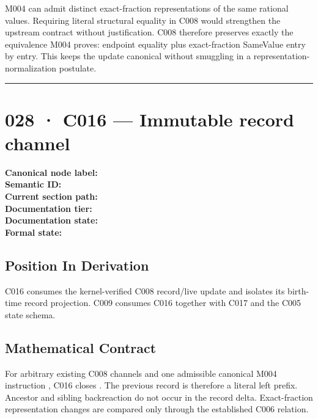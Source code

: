 M004 can admit distinct exact-fraction representations of the same
rational values. Requiring literal structural equality in C008 would
strengthen the upstream contract without justification. C008 therefore
preserves exactly the equivalence M004 proves: endpoint equality plus
exact-fraction SameValue entry by entry. This keeps the update canonical
without smuggling in a representation-normalization postulate.

\begin{center}\rule{0.5\linewidth}{0.5pt}\end{center}

\section{028 · C016 --- Immutable record
channel}\label{c016-immutable-record-channel}

\textbf{Canonical node label:} \texttt{\protect{}}\\
\textbf{Semantic ID:} \texttt{\protect{}}\\
\textbf{Current section path:} \texttt{\protect{}}\\
\textbf{Documentation tier:} \texttt{\protect{}}\\
\textbf{Documentation state:} \texttt{\protect{}}\\
\textbf{Formal state:}
\texttt{\protect{}}

\subsection{Position In Derivation}\label{position-in-derivation-24}

C016 consumes the kernel-verified C008 record/live update and isolates
its birth-time record projection. C009 consumes C016 together with C017
and the C005 state schema.

\subsection{Mathematical Contract}\label{mathematical-contract-11}

For arbitrary existing C008 channels and one admissible canonical M004
instruction \texttt{\protect{}}, C016 closes
\texttt{\protect{}}.
The previous record is therefore a literal left prefix. Ancestor and
sibling backreaction do not occur in the record delta. Exact-fraction
representation changes are compared only through the established C006
\texttt{\protect{}} relation.

